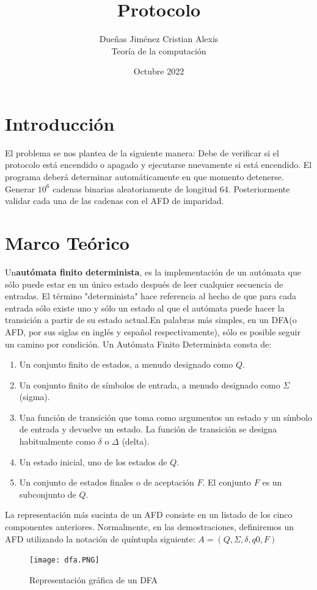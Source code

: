 \documentclass{article}
\title{Protocolo}
\author{Dueñas Jiménez Cristian Alexis\\Teoría de la computación}
\date{Octubre 2022}
\begin{document}
\maketitle
\section{Introducción}
El problema se nos plantea de la siguiente manera:
Debe de verificar si el protocolo está encendido o apagado y ejecutarse nuevamente si está encendido. El programa deberá determinar automáticamente en que momento detenerse. Generar $10^6$ cadenas binarias aleatoriamente de longitud 64. Posteriormente validar cada una de las cadenas con el AFD de imparidad.
\section{Marco Teórico}
Un\textbf{autómata finito determinista}, es la implementación de un autómata que sólo puede estar en un único estado después de leer cualquier secuencia de entradas. El término "determinista" hace referencia al hecho de que para cada entrada sólo existe uno y sólo un estado al que el autómata puede hacer la transición a partir de su estado actual.En palabras más simples, en un DFA(o AFD, por sus siglas en inglés y español respectivamente), sólo es posible seguir un camino por condición. 
Un Autómata Finito Determinista consta de:
\begin{enumerate}
    \item Un conjunto finito de estados, a menudo designado como $Q$.
    \item Un conjunto finito de símbolos de entrada, a menudo designado como $\Sigma$ (sigma).
    \item Una función de transición que toma como argumentos un estado y un símbolo de entrada y devuelve un estado. La función de transición se designa habitualmente como $\delta$ o $\Delta$ (delta).
    \item Un estado inicial, uno de los estados de $Q$.
    \item Un conjunto de estados finales o de aceptación $F$. El conjunto $F$ es un subconjunto de $Q$.
\end{enumerate}
La representación más sucinta de un AFD consiste en un listado de los cinco componentes anteriores. Normalmente, en las demostraciones, definiremos un AFD utilizando la notación de quíntupla siguiente:
$A= ( Q, \Sigma, \delta, q0, F )$

\begin{figure}[h!]
\centering
\texttt{[image: dfa.PNG]}
\caption{Representación gráfica de un DFA}
\end{figure}
\end{document}
